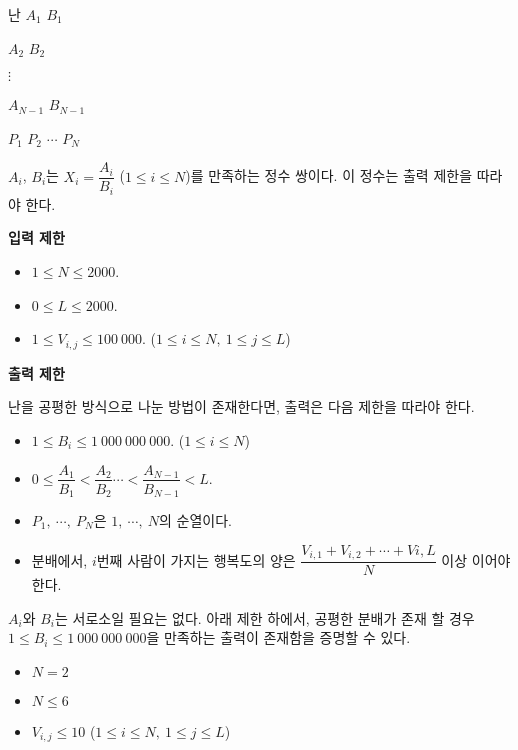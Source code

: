 \begin{problem}{난}
	$A_1$ $B_1$

	$A_2$ $B_2$

	$\vdots$ 
	
	$A_{N-1}$ $B_{N-1}$
	
	$P_1$ $P_2$ $\cdots$ $P_N$
	
	$A_i$, $B_i$는 $X_i = \dfrac{A_i}{B_i}$ ($1 \le i \le N$)를 만족하는 정수 쌍이다. 이 정수는 출력 제한을 따라야 한다.
	
	\Constraints


	{
	\large
	\textbf{입력 제한}
	}

	\begin{itemize}
		
		\item $1 \le N \le 2000$.
		\item $0 \le L \le 2000$.
		\item $1 \le V_{i, j} \le 100\ 000$. ($1 \le i \le N,\ 1 \le j \le L$)
	\end{itemize}

	{
	\large
	\textbf{출력 제한}
	}

	
	난을 공평한 방식으로 나눈 방법이 존재한다면, 출력은 다음 제한을 따라야 한다.
	
	\begin{itemize}
		\item $1 \le B_i \le 1\ 000\ 000\ 000$. ($1 \le i \le N$)
		\item $0 \le \dfrac{A_1}{B_1} < \dfrac{A_2}{B_2} \cdots < \dfrac{A_{N-1}}{B_{N-1}} < L$.
		\item $P_1, \ \cdots, \ P_N$은 $1, \ \cdots, \ N$의 순열이다.
		\item 분배에서, $i$번째 사람이 가지는 행복도의 양은 $\dfrac{V_{i, 1}+V_{i,2}+\cdots+V{i,L}}{N}$ 이상 이어야 한다.
	\end{itemize}
	
	$A_i$와 $B_i$는 서로소일 필요는 없다.
	아래 제한 하에서, 공평한 분배가 존재 할 경우 $1 \le B_i \le 1\ 000\ 000\ 000$을 만족하는 출력이 존재함을 증명할 수 있다.
	
	\begin{itemize}
		\item $N = 2$
	\end{itemize}
	
	\begin{itemize}
		\item $N \le 6$ 
		\item $V_{i, j} \le 10$ ($1 \le i \le N,\ 1 \le j \le L$)
	\end{itemize}
	

\end{problem}
